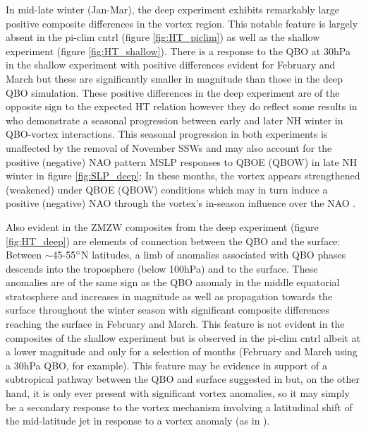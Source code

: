 In mid-late winter (Jan-Mar), the deep experiment exhibits remarkably large positive composite differences in the vortex region. This notable feature is largely absent in the pi-clim cntrl (figure \ref{fig:HT_piclim}) as well as the shallow experiment (figure \ref{fig:HT_shallow}). There is a response to the QBO at 30hPa in the shallow experiment with positive differences evident for February and March but these are significantly smaller in magnitude than those in the deep QBO simulation. These positive differences in the deep experiment are of the opposite sign to the expected HT relation however they do reflect some results in \cite{graySurface2018b} who demonstrate a seasonal progression between early and later NH winter in QBO-vortex interactions. This seasonal progression in both experiments is unaffected by the removal of November SSWs and may also account for the positive (negative) NAO pattern MSLP responses to QBOE (QBOW) in late NH winter in figure \ref{fig:SLP_deep}: In these months, the vortex appears strengthened (weakened) under QBOE (QBOW) conditions which may in turn induce a positive (negative) NAO through the vortex's in-season influence over the NAO \citep{charlton-perezInfluence2018e}. 

Also evident in the ZMZW composites from the deep experiment (figure \ref{fig:HT_deep}) are elements of connection between the QBO and the surface: Between $\sim$45-55$\degree$N latitudes, a limb of anomalies associated with QBO phases descends into the troposphere (below 100hPa) and to the surface. These anomalies are of the same sign as the QBO anomaly in the middle equatorial stratosphere and increases in magnitude as well as propagation towards the surface throughout the winter season with significant composite differences reaching the surface in February and March. This feature is not evident in the composites of the shallow experiment but is observed in the pi-clim cntrl albeit at a lower magnitude and only for a selection of months (February and March using a 30hPa QBO, for example). This feature may be evidence in support of a subtropical pathway between the QBO and surface suggested in \cite{graySurface2018b} but, on the other hand, it is only ever present with significant vortex anomalies, so it may simply be a secondary response to the vortex mechanism involving a latitudinal shift of the mid-latitude jet in response to a vortex anomaly (as in \cite{baldwinStratospheric2001a}). 


